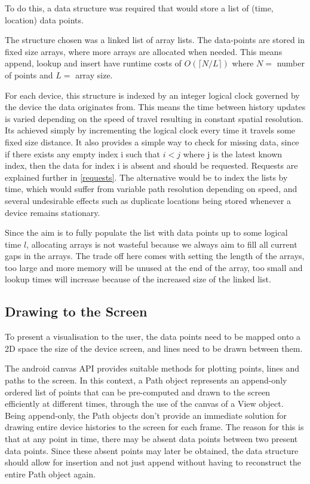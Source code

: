 To do this, a data structure was required that would store a list of (time, location) data points.

The structure chosen was a linked list of array lists. The data-points are stored in fixed size arrays, where more arrays are allocated when needed. This means append, lookup and insert have runtime costs of $ O(\lceil N/L \rceil ) $ where $ N = $ number of points and $ L =$ array size.

For each device, this structure is indexed by an integer logical clock governed by the device the data originates from. This means the time between history updates is varied depending on the speed of travel resulting in constant spatial resolution. Its achieved simply by incrementing the logical clock every time it travels some fixed size distance. It also provides a simple way to check for missing data, since if there exists any empty index i such that $i < j$ where j is the latest known index, then the data for index i is absent and should be requested. Requests are explained further in \ref{requests}.
The alternative would be to index the lists by time, which would suffer from variable path resolution depending on speed, and several undesirable effects such as duplicate locations being stored whenever a device remains stationary.

Since the aim is to fully populate the list with data points up to some logical time $l$, allocating arrays is not wasteful because we always aim to fill all current gaps in the arrays. The trade off here comes with setting the length of the arrays, too large and more memory will be unused at the end of the array, too small and lookup times will increase because of the increased size of the linked list.

\subsection{Drawing to the Screen}
\label{mapDisplay}

To present a visualisation to the user, the data points need to be mapped onto a 2D space the size of the device screen, and lines need to be drawn between them.

The android canvas API provides suitable methods for plotting points, lines and paths to the screen.\cite{androidAPI} In this context, a Path object represents an append-only ordered list of points that can be pre-computed and drawn to the screen efficiently at different times, through the use of the canvas of a View object.
Being append-only, the Path objects don't provide an immediate solution for drawing entire device histories to the screen for each frame. The reason for this is that at any point in time, there may be absent data points between two present data points. Since these absent points may later be obtained, the data structure should allow for insertion and not just append without having to reconstruct the entire Path object again.

